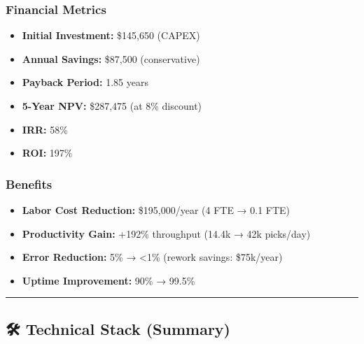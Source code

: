 \documentclass[
]{article}
\providecommand{\tightlist}{%
  \setlength{\itemsep}{0pt}\setlength{\parskip}{0pt}}
\begin{document}
\hypertarget{financial-metrics}{%
\subsubsection{Financial Metrics}\label{financial-metrics}}

\begin{itemize}
\tightlist
\item
  \textbf{Initial Investment:} \$145,650 (CAPEX)
\item
  \textbf{Annual Savings:} \$87,500 (conservative)
\item
  \textbf{Payback Period:} 1.85 years
\item
  \textbf{5-Year NPV:} \$287,475 (at 8\% discount)
\item
  \textbf{IRR:} 58\%
\item
  \textbf{ROI:} 197\%
\end{itemize}

\hypertarget{benefits}{%
\subsubsection{Benefits}\label{benefits}}

\begin{itemize}
\tightlist
\item
  \textbf{Labor Cost Reduction:} \$195,000/year (4 FTE → 0.1 FTE)
\item
  \textbf{Productivity Gain:} +192\% throughput (14.4k → 42k picks/day)
\item
  \textbf{Error Reduction:} 5\% → \textless1\% (rework savings:
  \$75k/year)
\item
  \textbf{Uptime Improvement:} 90\% → 99.5\%
\end{itemize}

\begin{center}\rule{0.5\linewidth}{0.5pt}\end{center}

\hypertarget{technical-stack-summary}{%
\subsection{🛠️ Technical Stack
(Summary)}\label{technical-stack-summary}}
\end{document}

